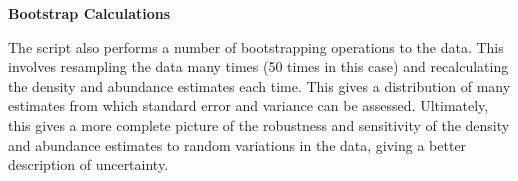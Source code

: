 \vspace{5mm}
\textbf{Bootstrap Calculations}

The script also performs a number of bootstrapping operations to the data.
This involves resampling the data many times (50 times in this case) and recalculating the
density and abundance estimates each time.
This gives a distribution of many estimates from which standard error and variance can be assessed.
Ultimately, this gives a more complete picture of the robustness and sensitivity of the density and
abundance estimates to random variations in the data, giving a better description of
uncertainty.\cite{distance_samping}

